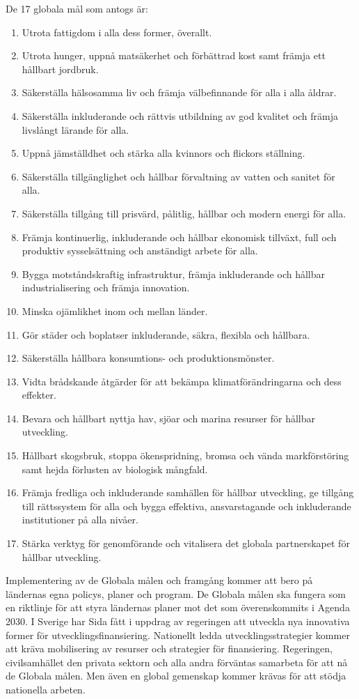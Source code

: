 \documentclass{report}
\begin{document}
 De 17 globala mål som antogs är: 
\begin{enumerate}
\item Utrota fattigdom i alla dess former, överallt.
\item Utrota hunger, uppnå matsäkerhet och förbättrad kost samt främja ett hållbart jordbruk.
\item Säkerställa hälsosamma liv och främja välbefinnande för alla i alla åldrar.
\item Säkerställa inkluderande och rättvis utbildning av god kvalitet och främja livslångt lärande för alla.
\item Uppnå jämställdhet och stärka alla kvinnors och flickors ställning.
\item Säkerställa tillgänglighet och hållbar förvaltning av vatten och sanitet för alla.
\item Säkerställa tillgång till prisvärd, pålitlig, hållbar och modern energi för alla.
\item Främja kontinuerlig, inkluderande och hållbar ekonomisk tillväxt, full och produktiv sysselsättning och anständigt arbete för alla.
\item Bygga motståndskraftig infrastruktur, främja inkluderande och hållbar industrialisering och främja innovation.
\item Minska ojämlikhet inom och mellan länder.
\item Gör städer och boplatser inkluderande, säkra, flexibla och hållbara.
\item Säkerställa hållbara konsumtions- och produktionsmönster.
\item Vidta brådskande åtgärder för att bekämpa klimatförändringarna och dess effekter.
\item Bevara och hållbart nyttja hav, sjöar och marina resurser för hållbar utveckling.
\item Hållbart skogsbruk, stoppa ökenspridning, bromsa och vända markförstöring samt hejda förlusten av biologisk mångfald.
\item Främja fredliga och inkluderande samhällen för hållbar utveckling, ge tillgång till rättssystem för alla och bygga effektiva, ansvarstagande och inkluderande institutioner på alla nivåer.
\item Stärka verktyg för genomförande och vitalisera det globala partnerskapet för hållbar utveckling. \cite{webKTH}
\end{enumerate}



Implementering av de Globala målen och framgång kommer att bero på ländernas egna policys, planer och program. De Globala målen ska fungera som en riktlinje för att styra ländernas planer mot det som överenskommits i Agenda 2030. \cite{web2030agenda}
I Sverige har Sida fått i uppdrag av regeringen att utveckla nya innovativa former för utvecklingsfinansiering. \cite{webSIDA}
Nationellt ledda utvecklingsstrategier kommer att kräva mobilisering av resurser och strategier för finansiering. Regeringen, civilsamhället den privata sektorn och alla andra förväntas samarbeta för att nå de Globala målen. Men även en global gemenskap kommer krävas för att stödja nationella arbeten. 
\end{document}
